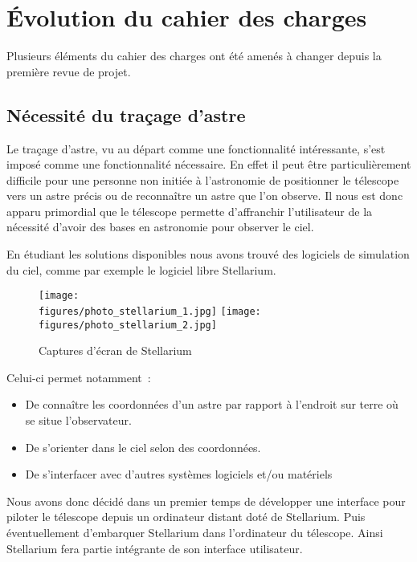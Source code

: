 \chapter{Évolution du cahier des charges}
\label{chapter1}

Plusieurs éléments du cahier des charges ont été amenés à changer depuis la première revue de projet.

\section{Nécessité du traçage d'astre}

Le traçage d'astre, vu au départ comme une fonctionnalité intéressante, s'est imposé comme une fonctionnalité nécessaire. En effet il peut être particulièrement difficile pour une personne non initiée à l'astronomie de positionner le télescope vers un astre précis ou de reconnaître un astre que l'on observe. Il nous est donc apparu primordial que le télescope permette d'affranchir l'utilisateur de la nécessité d'avoir des bases en astronomie pour observer le ciel.

\vspace{1cm}

En étudiant les solutions disponibles nous avons trouvé des logiciels de simulation du ciel, comme par exemple le logiciel libre Stellarium.

\begin{figure}[H]
    \centering
    \texttt{[image: \\figures/photo\_stellarium\_1.jpg]}
	\texttt{[image: \\figures/photo\_stellarium\_2.jpg]}
    \decoRule
    \caption[
    Captures d'écran de Stellarium]{
    Captures d'écran de Stellarium}
    \label{fig:Captures d'écran de Stellarium}
    \end{figure}

\vspace{1cm}

Celui-ci permet notamment~:
\begin{itemize}[label=$\bullet$]
	\item De connaître les coordonnées d'un astre par rapport à l'endroit sur terre où se situe l'observateur.
	\item De s'orienter dans le ciel selon des coordonnées.
	\item De s'interfacer avec d'autres systèmes logiciels et/ou matériels
	\end{itemize}

Nous avons donc décidé dans un premier temps de développer une interface pour piloter le télescope depuis un ordinateur distant doté de Stellarium. Puis éventuellement d'embarquer Stellarium dans l'ordinateur du télescope. Ainsi Stellarium fera partie intégrante de son interface utilisateur.

